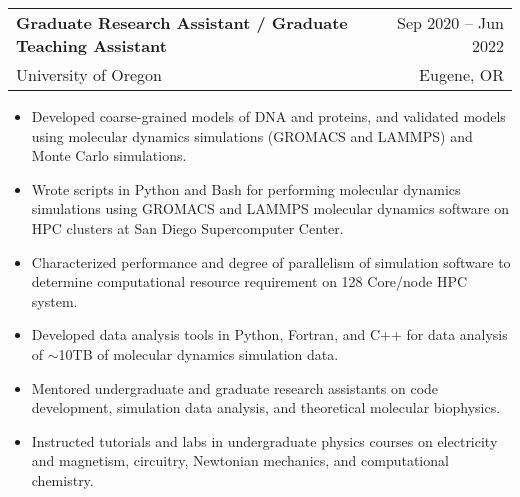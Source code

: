\documentclass[letterpaper,10.8pt]{article}
\makeatletter
\newcommand{\resumeSubheading}[4]{
  \vspace{-1pt} \item
    \begin{tabular*}{0.97\textwidth}{l@{\extracolsep{\fill}}r}
      \textbf{#1} & #2 \\
      #3  &  #4 \\
    \end{tabular*}\vspace{-5pt}
}
\makeatother
\begin{document}
    \resumeSubheading
		{Graduate Research Assistant / Graduate Teaching Assistant}{Sep 2020 – Jun 2022}
		{University of Oregon}{Eugene, OR}
	\begin{itemize}[leftmargin=*,label={$\diamond$}]
	\itemsep0em  %
	
	
	\item{Developed coarse-grained models of DNA and proteins, and validated models using molecular dynamics simulations (GROMACS and LAMMPS) and Monte Carlo simulations.}
	
	
	\item{Wrote scripts in Python and Bash for performing molecular dynamics simulations using GROMACS and LAMMPS molecular dynamics software on HPC clusters at San Diego Supercomputer Center.}
	
	\item{Characterized performance and degree of parallelism of simulation software to determine computational resource requirement on 128 Core/node HPC system.}

	\item{Developed data analysis tools in Python, Fortran, and C++ for data analysis of $\sim$10TB of molecular dynamics simulation data.}
	
	
	
	
	\item{Mentored undergraduate and graduate research assistants on code development, simulation data analysis, and theoretical molecular biophysics.}
	
	\item {Instructed tutorials and labs in undergraduate physics courses on electricity and magnetism, circuitry, Newtonian mechanics, and computational chemistry.}
	
	
	\end{itemize} %
	
\end{document}
